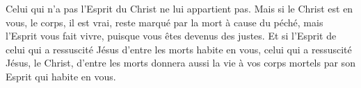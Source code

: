 Celui qui n’a pas l’Esprit du Christ ne lui appartient pas.
Mais si le Christ est en vous,
	le corps, il est vrai, reste marqué par la mort à cause du péché,
	mais l’Esprit vous fait vivre, puisque vous êtes devenus des justes.
Et si l’Esprit de celui qui a ressuscité Jésus d’entre les morts habite en vous,
	celui qui a ressuscité Jésus, le Christ, d’entre les morts
	donnera aussi la vie à vos corps mortels par son Esprit qui habite en vous.
